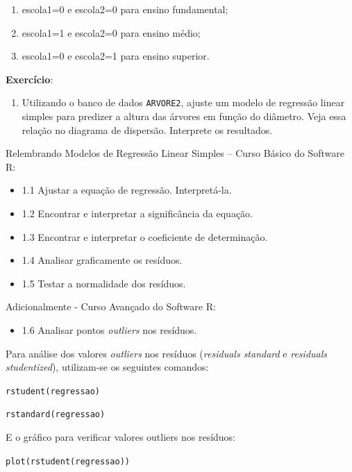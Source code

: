 \documentclass[12pt,brazil,oneside]{book}
\providecommand{\tightlist}{%
  \setlength{\itemsep}{0pt}\setlength{\parskip}{0pt}}
\begin{document}
\begin{enumerate}
\def\labelenumi{\alph{enumi}.}
\tightlist
\item
  escola1=0 e escola2=0 para ensino fundamental;
\item
  escola1=1 e escola2=0 para ensino médio;
\item
  escola1=0 e escola2=1 para ensino superior.
\end{enumerate}

\textbf{Exercício}:

\begin{enumerate}
\def\labelenumi{\arabic{enumi})}
\tightlist
\item
  Utilizando o banco de dados \texttt{ARVORE2}, ajuste um modelo de
  regressão linear simples para predizer a altura das árvores em função
  do diâmetro. Veja essa relação no diagrama de dispersão. Interprete os
  resultados.
\end{enumerate}

Relembrando Modelos de Regressão Linear Simples -- Curso Básico do
Software R:

\begin{itemize}
\tightlist
\item
  1.1 Ajustar a equação de regressão. Interpretá-la.
\item
  1.2 Encontrar e interpretar a significância da equação.
\item
  1.3 Encontrar e interpretar o coeficiente de determinação.
\item
  1.4 Analisar graficamente os resíduos.
\item
  1.5 Testar a normalidade dos resíduos.
\end{itemize}

Adicionalmente - Curso Avançado do Software R:

\begin{itemize}
\tightlist
\item
  1.6 Analisar pontos \emph{outliers} nos resíduos.
\end{itemize}

Para análise dos valores \emph{outliers} nos resíduos (\emph{residuals
standard} e \emph{residuals studentized}), utilizam-se os seguintes
comandos:

\texttt{rstudent(regressao)}

\texttt{rstandard(regressao)}

E o gráfico para verificar valores outliers nos resíduos:

\texttt{plot(rstudent(regressao))}
\end{document}
